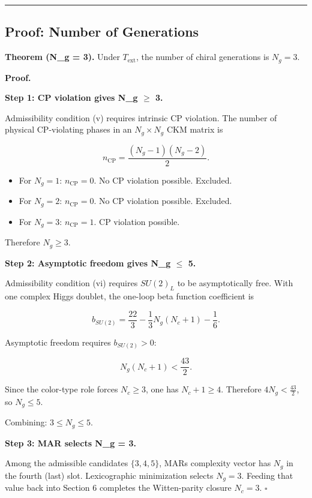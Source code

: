 \begin{center}\rule{0.5\linewidth}{0.5pt}\end{center}

\subsection{Proof: Number of Generations}\label{7-proof-number-of-generations}

\textbf{Theorem (N\_g = 3).} Under \(T_{\mathrm{ext}}\), the number of chiral generations is \(N_g = 3\).

\textbf{Proof.}

\textbf{Step 1: CP violation gives N\_g \ensuremath{\geq} 3.}

Admissibility condition (v) requires intrinsic CP violation. The number of physical CP-violating phases in an \(N_g \times N_g\) CKM matrix is

\[n_{\mathrm{CP}} = \frac{(N_g - 1)(N_g - 2)}{2}.\]

\begin{itemize}
\tightlist
\item
  For \(N_g = 1\): \(n_{\mathrm{CP}} = 0\). No CP violation possible. Excluded.
\item
  For \(N_g = 2\): \(n_{\mathrm{CP}} = 0\). No CP violation possible. Excluded.
\item
  For \(N_g = 3\): \(n_{\mathrm{CP}} = 1\). CP violation possible.
\end{itemize}

Therefore \(N_g \geq 3\).

\textbf{Step 2: Asymptotic freedom gives N\_g \ensuremath{\leq} 5.}

Admissibility condition (vi) requires \(SU(2)_L\) to be asymptotically free. With one complex Higgs doublet, the one-loop beta function coefficient is

\[b_{SU(2)} = \frac{22}{3} - \frac{1}{3}N_g(N_c + 1) - \frac{1}{6}.\]

Asymptotic freedom requires \(b_{SU(2)} > 0\):

\[N_g(N_c + 1) < \frac{43}{2}.\]

Since the color-type role forces \(N_c \ge 3\), one has \(N_c + 1 \ge 4\). Therefore \(4N_g < \frac{43}{2}\), so \(N_g \leq 5\).

Combining: \(3 \leq N_g \leq 5\).

\textbf{Step 3: MAR selects N\_g = 3.}

Among the admissible candidates \(\{3, 4, 5\}\), MAR\textquotesingle s complexity vector has \(N_g\) in the fourth (last) slot. Lexicographic minimization selects \(N_g = 3\). Feeding that value back into Section 6 completes the Witten-parity closure \(N_c = 3\). \(\square\)

